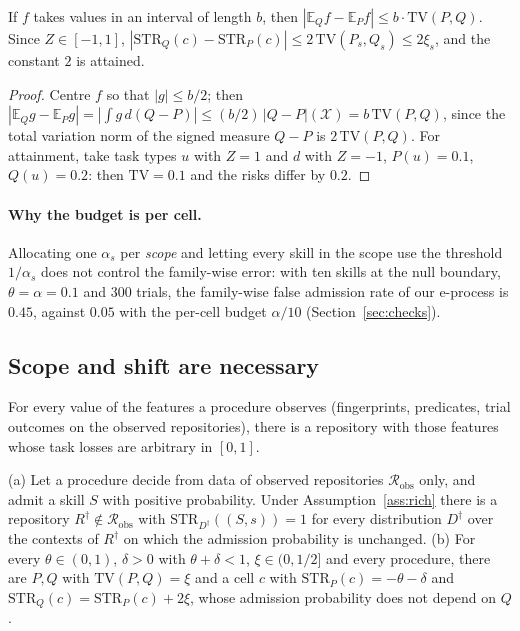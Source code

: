 \begin{lemma}[Shift]\label{lem:shift}
If $f$ takes values in an interval of length $b$, then $|\mathbb{E}_Qf-\mathbb{E}_Pf|\le b\cdot\mathrm{TV}(P,Q)$.  Since
$Z\in[-1,1]$, $|\mathrm{STR}_Q(c)-\mathrm{STR}_P(c)|\le2\,\mathrm{TV}(P_s,Q_s)\le2\xi_s$, and the constant $2$ is attained.
\end{lemma}

\begin{proof}
Centre $f$ so that $|g|\le b/2$; then $|\mathbb{E}_Qg-\mathbb{E}_Pg|=|\int g\,d(Q-P)|\le(b/2)\,|Q-P|(\mathcal{X})=b\,\mathrm{TV}(P,Q)$,
since the total variation norm of the signed measure $Q-P$ is $2\,\mathrm{TV}(P,Q)$.  For
attainment, take task types $u$ with $Z=1$ and $d$ with $Z=-1$, $P(u)=0.1$, $Q(u)=0.2$: then $\mathrm{TV}=0.1$ and the risks
differ by $0.2$.
\end{proof}

\paragraph{Why the budget is per cell.}
Allocating one $\alpha_s$ per \emph{scope} and letting every skill in the scope use the threshold $1/\alpha_s$ does not
control the family-wise error: with ten skills at the null boundary, $\theta=\alpha=0.1$ and $300$ trials, the family-wise
false admission rate of our e-process is $0.45$, against $0.05$ with the per-cell budget $\alpha/10$
(Section~\ref{sec:checks}).

\subsection{Scope and shift are necessary}

\begin{assumption}\label{ass:rich}
For every value of the features a procedure observes (fingerprints, predicates, trial outcomes on the observed
repositories), there is a repository with those features whose task losses are arbitrary in $[0,1]$.
\end{assumption}

\begin{proposition}\label{prop:nofree}
\textup{(a)} Let a procedure decide from data of observed repositories $\mathcal{R}_{\mathrm{obs}}$ only, and admit a skill
$S$ with positive probability.  Under Assumption~\ref{ass:rich} there is a repository $R^\dagger\notin\mathcal{R}_{\mathrm{obs}}$
with $\mathrm{STR}_{D^\dagger}((S,s))=1$ for every distribution $D^\dagger$ over the contexts of $R^\dagger$ on which the admission probability is unchanged.
\textup{(b)} For every $\theta\in(0,1)$, $\delta>0$ with $\theta+\delta<1$, $\xi\in(0,1/2]$ and every procedure, there are
$P,Q$ with $\mathrm{TV}(P,Q)=\xi$ and a cell $c$ with $\mathrm{STR}_P(c)=-\theta-\delta$ and
$\mathrm{STR}_Q(c)=\mathrm{STR}_P(c)+2\xi$, whose admission probability does not depend on $Q$.
\end{proposition}

